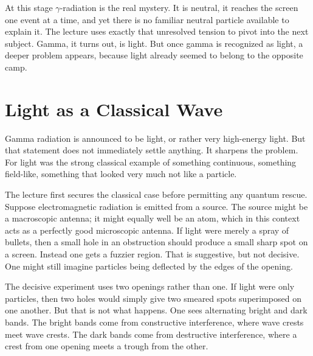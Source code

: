 At this stage \(\gamma\)-radiation is the real mystery. It is neutral, it reaches the screen one event at a time, and yet there is no familiar neutral particle available to explain it. The lecture uses exactly that unresolved tension to pivot into the next subject. Gamma, it turns out, is light. But once gamma is recognized as light, a deeper problem appears, because light already seemed to belong to the opposite camp.

\section{Light as a Classical Wave}

Gamma radiation is announced to be light, or rather very high-energy light. But that statement does not immediately settle anything. It sharpens the problem. For light was the strong classical example of something continuous, something field-like, something that looked very much not like a particle.

The lecture first secures the classical case before permitting any quantum rescue. Suppose electromagnetic radiation is emitted from a source. The source might be a macroscopic antenna; it might equally well be an atom, which in this context acts as a perfectly good microscopic antenna. If light were merely a spray of bullets, then a small hole in an obstruction should produce a small sharp spot on a screen. Instead one gets a fuzzier region. That is suggestive, but not decisive. One might still imagine particles being deflected by the edges of the opening.

The decisive experiment uses two openings rather than one. If light were only particles, then two holes would simply give two smeared spots superimposed on one another. But that is not what happens. One sees alternating bright and dark bands. The bright bands come from constructive interference, where wave crests meet wave crests. The dark bands come from destructive interference, where a crest from one opening meets a trough from the other.

